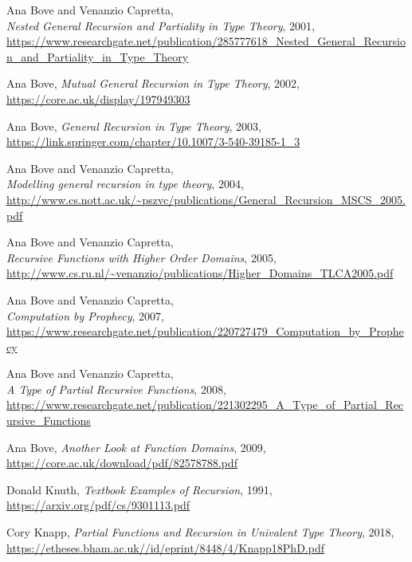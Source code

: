 \documentclass[declaration,mgr,english,shortabstract]{iithesis}
\begin{document}
\begin{thebibliography}{1}
    Ana Bove and Venanzio Capretta, \\
    \textit{Nested General Recursion and Partiality in Type Theory},
    2001, \\
    \url{https://www.researchgate.net/publication/285777618_Nested_General_Recursion_and_Partiality_in_Type_Theory}

    Ana Bove,
    \textit{Mutual General Recursion in Type Theory},
    2002, \\
    \url{https://core.ac.uk/display/197949303}

    Ana Bove,
    \textit{General Recursion in Type Theory},
    2003, \\
    \url{https://link.springer.com/chapter/10.1007/3-540-39185-1_3}

    Ana Bove and Venanzio Capretta, \\
    \textit{Modelling general recursion in type theory},
    2004, \\
    \url{http://www.cs.nott.ac.uk/~pszvc/publications/General_Recursion_MSCS_2005.pdf}

    Ana Bove and Venanzio Capretta, \\
    \textit{Recursive Functions with Higher Order Domains},
    2005, \\
    \url{http://www.cs.ru.nl/~venanzio/publications/Higher_Domains_TLCA2005.pdf}

    Ana Bove and Venanzio Capretta, \\
    \textit{Computation by Prophecy},
    2007, \\
    \url{https://www.researchgate.net/publication/220727479_Computation_by_Prophecy}

    Ana Bove and Venanzio Capretta, \\
    \textit{A Type of Partial Recursive Functions},
    2008, \\
    \url{https://www.researchgate.net/publication/221302295_A_Type_of_Partial_Recursive_Functions}

    Ana Bove,
    \textit{Another Look at Function Domains},
    2009, \\
    \url{https://core.ac.uk/download/pdf/82578788.pdf}

    Donald Knuth,
    \textit{Textbook Examples of Recursion},
    1991, \\
    \url{https://arxiv.org/pdf/cs/9301113.pdf}

    Cory Knapp,
    \textit{Partial Functions and Recursion in Univalent Type
    Theory},
    2018, \\
    \url{https://etheses.bham.ac.uk//id/eprint/8448/4/Knapp18PhD.pdf}


\end{thebibliography}
\end{document}
